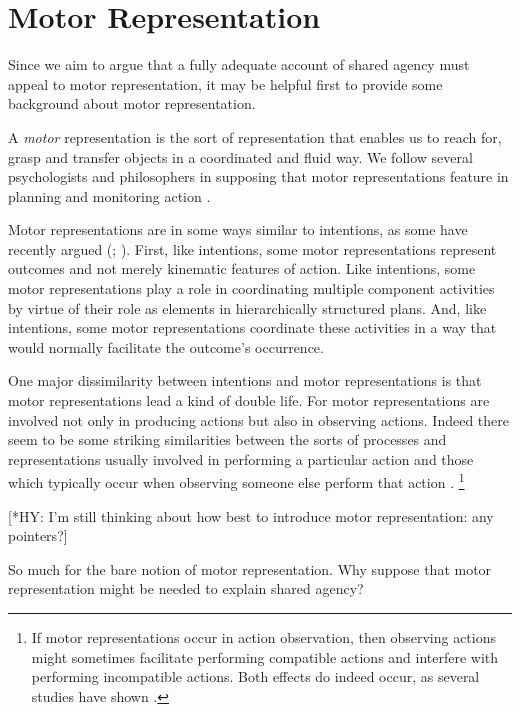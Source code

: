\documentclass[12pt,\papersize]{extarticle}
\begin{document}
\section{Motor Representation}
Since we aim to argue that a fully adequate account of shared agency must appeal to motor representation, it may be helpful first to provide some background about motor representation.

A \textit{motor} representation is the sort of representation that enables us to reach for, grasp and transfer objects in a coordinated and fluid way.
We follow several psychologists and philosophers in supposing that motor representations feature in planning and monitoring action \citep[e.g.]{wolpert:1995internal, miall:1996_forward}.

Motor representations are in some ways similar to intentions,
as some have recently argued (\citealp[pp.\ 189-90]{pacherie:2008_action}; \citealp{butterfill:2012_intention}).
First, like intentions, some motor representations represent outcomes and not merely kinematic features of action.
Like intentions, some motor representations play a role in coordinating multiple  component activities by virtue of their role as elements in hierarchically structured plans.
And, like intentions, some motor representations coordinate these activities in a way that would normally facilitate the outcome’s occurrence.

One major dissimilarity between intentions and motor representations is that motor representations lead a kind of double life.
For motor representations are involved not only in producing actions but also in observing actions. Indeed there seem to be some striking similarities between the sorts of processes and representations usually involved in performing a particular action and those which typically occur when observing someone else perform that action \citep{rizzolatti_functional_2010,rizzolatti_mirrors_2008}.%
\footnote{ 
If motor representations occur in action observation, then observing actions might sometimes facilitate performing compatible actions and interfere with performing incompatible actions.  Both effects do indeed occur, as several studies have shown \citep{brass:2000_compatibility, craighero:2002_hand, kilner:2003_interference, costantini:2012_does}. 
}


[*HY: I'm still thinking about how best to introduce motor representation: any pointers?]


So much for the bare notion of motor representation.
Why suppose that motor representation might be needed to explain shared agency?
\end{document}
